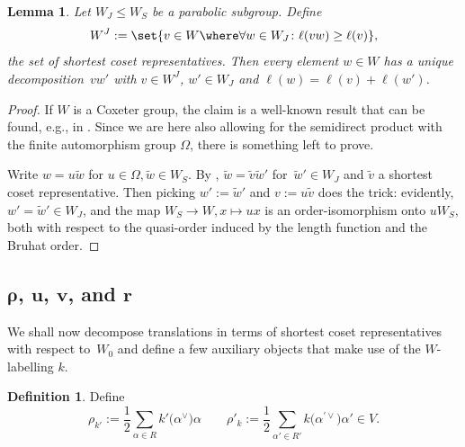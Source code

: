 \documentclass[10pt,a4paper]{amsart}
\newtheorem{Lemma}[Theorem]{Lemma}
\theoremstyle{definition}
\newtheorem{Definition}[Theorem]{Definition}
\numberwithin{equation}{section}
\begin{document}
\begin{Lemma}\label{sec:lem-existence-shortest-coset-dec}
 Let $W_J\le W_S$ be a parabolic subgroup. Define
 \[
 W^J := \set{v\in W\where\forall w\in W_J\colon \ell(vw)\ge\ell(v)},
 \]
 the set of shortest coset representatives. Then every element
 $w\in W$ has a unique decomposition~$vw'$ with $v\in W^J$, $w'\in W_J$ and $\ell(w)=\ell(v)+\ell(w')$.
\end{Lemma}
\begin{proof}
 If $W$ is a Coxeter group, the claim is a well-known result that
 can be found, e.g., in \cite[Section~5.12, Proposition~1.12]{humphreysRefl}. Since we are here also allowing for the semidirect
 product with the finite automorphism group $\Omega$, there is something left to prove.

 Write $w=u\tilde{w}$ for $u\in\Omega,\tilde{w}\in W_S$. By \cite[Section~5.12, Proposition~1.12]{humphreysRefl}, $\tilde{w}=\tilde{v}\tilde{w}'$
 for~${\tilde{w}'\in W_J}$ and $\tilde{v}$ a shortest coset representative. Then
 picking $w':= \tilde{w}'$ and $v:=u\tilde{v}$ does the trick: evidently,
 $w'=\tilde{w}'\in W_J$, and the map $W_S\to W, x\mapsto ux$ is an order-isomorphism
 onto $uW_S$, both with respect to the quasi-order induced by the length function
 and the Bruhat order.
\end{proof}

\subsection[rho, u, v, and r]{$\boldsymbol{\rho}$, $\boldsymbol{u}$, $\boldsymbol{v}$, and $\boldsymbol{r}$}
We shall now decompose translations in terms of shortest coset
representatives with respect to~$W_0$ and define a few auxiliary objects
that make use of the $W$-labelling $k$.

\begin{Definition}
 Define
 \[
 \rho_{k'} := \frac{1}{2}\sum_{\alpha\in R} k'\bigl(\alpha^\vee\bigr)\alpha
 \qquad \rho'_k := \frac{1}{2}\sum_{\alpha'\in R'} k\bigl(\alpha^{\prime\vee}\bigr)\alpha' \in V.
 \]
\end{Definition}
\end{document}
